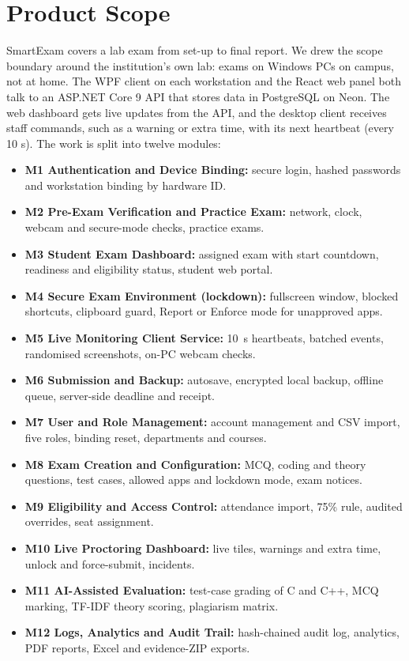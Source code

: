 \section{Product Scope}

SmartExam covers a lab exam from set-up to final report. We drew the scope boundary \cite[ch.~5]{pmbok6} around the institution's own lab: exams on Windows PCs on campus, not at home. The WPF client on each workstation and the React web panel both talk to an ASP.NET Core 9 API that stores data in PostgreSQL on Neon. The web dashboard gets live updates from the API, and the desktop client receives staff commands, such as a warning or extra time, with its next heartbeat (every 10 s). The work is split into twelve modules:

\begin{itemize}[noitemsep]
\item \textbf{M1 Authentication and Device Binding:} secure login, hashed passwords and workstation binding by hardware ID.
\item \textbf{M2 Pre-Exam Verification and Practice Exam:} network, clock, webcam and secure-mode checks, practice exams.
\item \textbf{M3 Student Exam Dashboard:} assigned exam with start countdown, readiness and eligibility status, student web portal.
\item \textbf{M4 Secure Exam Environment (lockdown):} fullscreen window, blocked shortcuts, clipboard guard, Report or Enforce mode for unapproved apps.
\item \textbf{M5 Live Monitoring Client Service:} 10~s heartbeats, batched events, randomised screenshots, on-PC webcam checks.
\item \textbf{M6 Submission and Backup:} autosave, encrypted local backup, offline queue, server-side deadline and receipt.
\item \textbf{M7 User and Role Management:} account management and CSV import, five roles, binding reset, departments and courses.
\item \textbf{M8 Exam Creation and Configuration:} MCQ, coding and theory questions, test cases, allowed apps and lockdown mode, exam notices.
\item \textbf{M9 Eligibility and Access Control:} attendance import, 75\% rule, audited overrides, seat assignment.
\item \textbf{M10 Live Proctoring Dashboard:} live tiles, warnings and extra time, unlock and force-submit, incidents.
\item \textbf{M11 AI-Assisted Evaluation:} test-case grading of C and C++, MCQ marking, TF-IDF theory scoring, plagiarism matrix.
\item \textbf{M12 Logs, Analytics and Audit Trail:} hash-chained audit log, analytics, PDF reports, Excel and evidence-ZIP exports.
\end{itemize}

